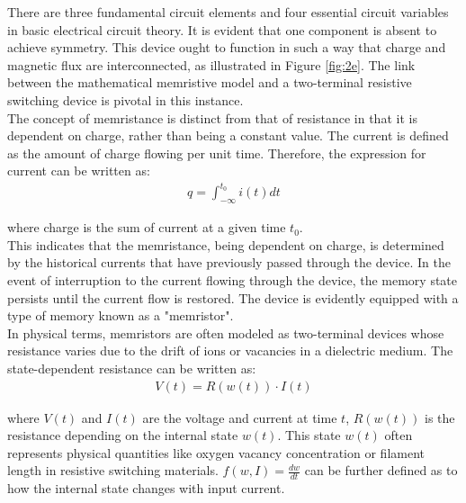 \noindent There are three fundamental circuit elements and four essential circuit variables in basic electrical circuit theory.  It is evident that one component is absent to achieve symmetry. This device ought to function in such a way that charge and magnetic flux are interconnected, as illustrated in Figure \ref{fig:2e}. The link between the mathematical memristive model and a two-terminal resistive switching device is pivotal in this instance. \\

\noindent The concept of memristance is distinct from that of resistance in that it is dependent on charge, rather than being a constant value.  The current is defined as the amount of charge flowing per unit time. Therefore, the expression for current can be written as:
\begin{align}
    q = \int_{-\infty}^{t_0} i(t)dt \label{eq:2.23}
\end{align}

\noindent where charge is the sum of current at a given time $t_0$.  \\

\noindent This indicates that the memristance, being dependent on charge, is determined by the historical currents that have previously passed through the device. In the event of interruption to the current flowing through the device, the memory state persists until the current flow is restored. The device is evidently equipped with a type of memory known as a "memristor".\\

\noindent In physical terms, memristors are often modeled as two-terminal devices whose resistance varies due to the drift of ions or vacancies in a dielectric medium. The state-dependent resistance can be written as:
\begin{align}
    V(t) = R(w(t)) \cdot I(t) \label{eq:2.24}
\end{align}

\noindent where $V(t)$ and $I(t)$ are the voltage and current at time $t$, $R(w(t))$ is the resistance depending on the internal state $w(t)$. This state $w(t)$ often represents physical quantities like oxygen vacancy concentration or filament length in resistive switching materials. $f(w, I) = \frac{dw}{dt}$ can be further defined as to how the internal state changes with input current. \\

